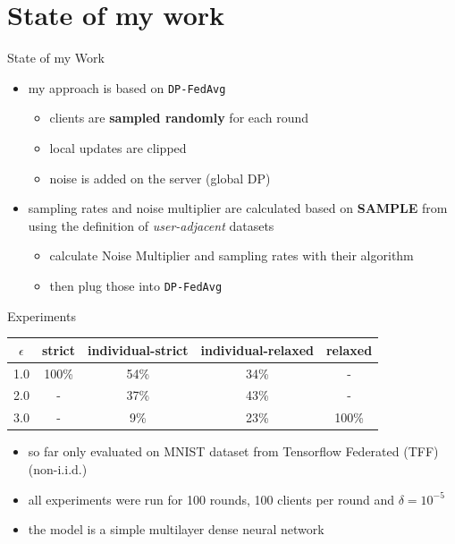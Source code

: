 \documentclass[aspectratio=169]{beamer}
\begin{document}
\section{State of my work}

\begin{frame}{State of my Work}
    \begin{itemize}
        \item my approach is based on \texttt{DP-FedAvg} \parencite{mcmahan:2018}
        \begin{itemize}
            \item clients are \textbf{sampled randomly} for each round
            \item local updates are clipped
            \item noise is added on the server (global DP) 
        \end{itemize}
        \item<2-> sampling rates and noise multiplier are calculated based on \textbf{SAMPLE} from \textcite{boenisch:2023} using the definition of \textit{user-adjacent} datasets
        \begin{itemize}
            \item calculate Noise Multiplier and sampling rates with their algorithm
            \item then plug those into \texttt{DP-FedAvg}
        \end{itemize}
    \end{itemize}
\end{frame}

\begin{frame}{Experiments}
\begin{table}[]
    \centering
    \begin{tabular}{|c|c|c|c|c|}
        \hline
        $\epsilon$ & strict & individual-strict & individual-relaxed & relaxed \\
        \hline
        1.0 & 100\% & 54\% & 34\% & - \\
        2.0 & - & 37\% & 43\% & - \\
        3.0 & - & 9\% & 23\% & 100\% \\
        \hline
    \end{tabular}
    \label{tab:experiment-setup}
\end{table}
    \begin{itemize}
        \item so far only evaluated on MNIST dataset from Tensorflow Federated (TFF) (non-i.i.d.)
        \item all experiments were run for 100 rounds, 100 clients per round and $\delta = 10^{-5}$
        \item the model is a simple multilayer dense neural network
    \end{itemize}
\end{frame}
\end{document}
